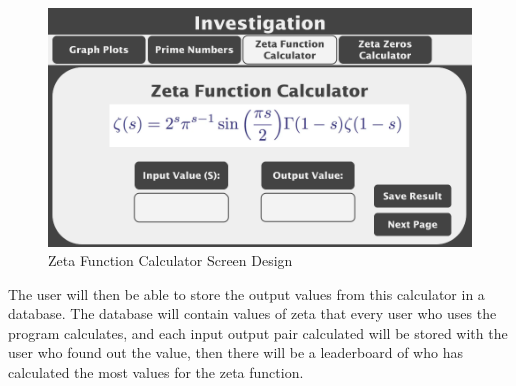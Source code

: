 \documentclass{article}
\begin{document}
\begin{figure}[h]
    \centering
    \includegraphics[scale=0.18]{zeta-function-calculator-screen-design}
    \caption{Zeta Function Calculator Screen Design}
\end{figure}

The user will then be able to store the output values from this calculator in a database. The database will contain values of zeta that every user who uses the program calculates, and each input output pair calculated will be stored with the user who found out the value, then there will be a leaderboard of who has calculated the most values for the zeta function.

\nocite{*}
\printbibliography
{}
\end{document}
